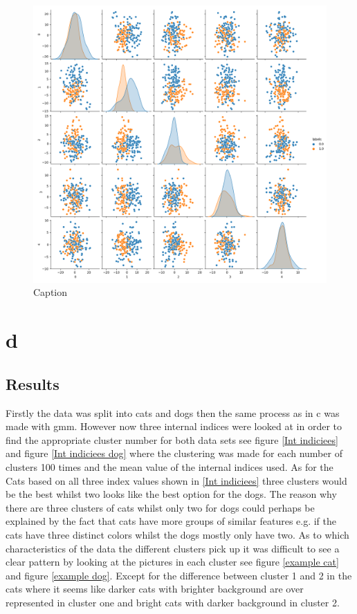 \documentclass{article}
\begin{document}
\begin{figure}[H]
    \centering
    \includegraphics[scale = 0.3]{1c/True labels sns.png}
    \caption{Caption}
    \label{pca}
\end{figure}
\newpage
\section{d}
\subsection{Results}
Firstly the data was split into cats and dogs then the same process as in c was made with gmm. However now three internal indices were looked at in order to find the appropriate cluster number for both data sets see figure \ref{Int indiciees} and figure \ref{Int indiciees dog} where the clustering was made for each number of clusters 100 times and the mean value of the internal indices used. As for the Cats based on all three index values shown in \ref{Int indiciees} three clusters would be the best whilst two looks like the best option for the dogs. The reason why there are three clusters of cats whilst only two for dogs could perhaps be explained by the fact that cats have more groups of similar features e.g. if the cats have three distinct colors whilst the dogs mostly only have two. As to which characteristics of the data the different clusters pick up it was difficult to see a clear pattern by looking at the pictures in each cluster see figure \ref{example cat} and figure \ref{example dog}. Except for the difference between cluster 1 and 2 in the cats where it seems like darker cats with brighter background are over represented in cluster one and bright cats with darker background in cluster 2. 
\end{document}
